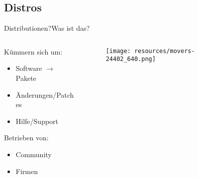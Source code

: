 \subsection{Distros}
\begin{frame}{Distributionen?}{Was ist das?}
\begin{columns}
	\begin{column}{0.45\textwidth}
		
		Kümmern sich um:  
		\begin{itemize}
			\item Software $\longrightarrow$ Pakete
			\item Änderungen/Patches
			\item Hilfe/Support 
		\end{itemize}
		Betrieben von: 
		\begin{itemize}
			\item Community
			\item Firmen
		\end{itemize}
	\end{column}
	\begin{column}{0.4\textwidth}
		\begin{figure}
			\texttt{[image: resources/movers-24402\_640.png]}
		\end{figure}
	\end{column}
\end{columns}
\end{frame}



